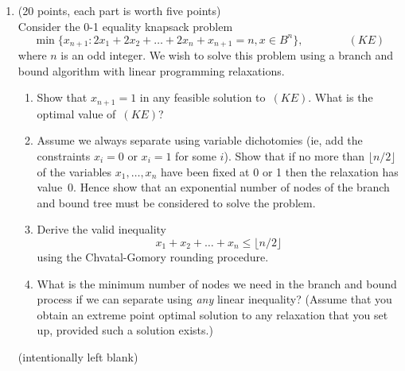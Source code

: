 \documentclass[12pt]{article}
\begin{document}
\begin{enumerate}
  \item (20 points, each part is worth five points)  \\
          Consider the 0-1 equality knapsack problem
          \begin{displaymath}
             \min \{x_{n+1} : 2x_1 + 2x_2 + \ldots + 2x_n + x_{n+1} = n,
                         x \in B^n \},  \qquad\qquad (KE)
          \end{displaymath}
          where $n$ is an odd integer.
          We wish to solve this problem using a branch and bound algorithm
          with linear programming relaxations.
       \begin{enumerate}
         \item
          Show that $x_{n+1}=1$ in any feasible solution to~$(KE)$. 
          What is the optimal value of~$(KE)$?
         \item
          Assume
          we always separate using variable dichotomies
          (ie, add the constraints $x_i = 0$ or $x_i = 1$ for some $i$).
          Show that if no more than $\lfloor n/2 \rfloor$
          of the variables $x_1,\ldots,x_n$
          have been fixed at 0 or 1 then the relaxation has value~0.
          Hence show that an exponential number of nodes of the
          branch and bound tree must be considered to solve the problem.
         \item
          Derive the valid inequality
\begin{displaymath}
             x_1 + x_2 + \ldots + x_n \leq \lfloor n/2 \rfloor
\end{displaymath}
          using the Chvatal-Gomory rounding procedure.
         \item
          What is the minimum number of nodes we need in the branch and bound
          process if we can separate using {\em any} linear inequality?
          (Assume that you obtain an extreme point optimal solution to any
          relaxation that you set up, provided such a solution exists.)
       \end{enumerate}

\pagebreak

\addtocounter{page}{-1}
(intentionally left blank)

\pagebreak




\end{enumerate}
\end{document}
